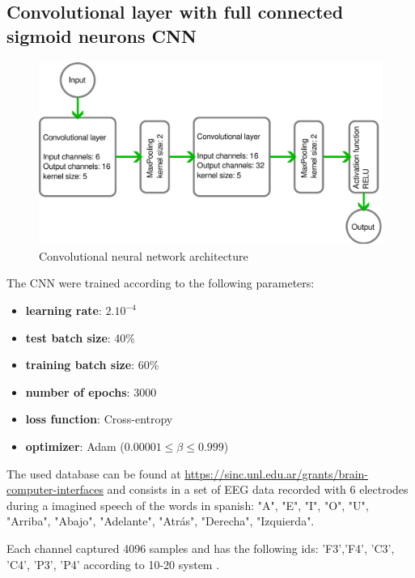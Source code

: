 	\subsection{Convolutional layer with full connected sigmoid neurons CNN}

	\begin{figure}[H]
		\centering
		\includegraphics[width=.7\linewidth]{images/architectureCNN}
		\caption{Convolutional neural network architecture}
		\label{fig:architecturecnn}
	\end{figure}

	\begin{multicols}{2}
		\par The CNN were trained according to the following parameters:
		\begin{itemize}
			\item \textbf{learning rate}: $2.10^{-4}$
			\item \textbf{test batch size}: 40\%
			\item \textbf{training batch size}: 60\%
			\item \textbf{number of epochs}: 3000
			\item \textbf{loss function}: Cross-entropy
			\item \textbf{optimizer}: Adam ($0.00001 \leq \beta \leq 0.999$)
		\end{itemize}
	\columnbreak	
		
	\end{multicols}


	\par The used  database \cite{PRG16} can be found at \href{https://sinc.unl.edu.ar/grants/brain-computer-interfaces/}{https://sinc.unl.edu.ar/grants/brain-computer-interfaces} and consists in a set of EEG data recorded with 6 electrodes during a imagined speech of the words in spanish: 
	"A", "E", "I", "O", "U", "Arriba", "Abajo", "Adelante", "Atrás", "Derecha", "Izquierda".\newline
		
	\par Each channel captured 4096 samples and has the following ids: 'F3','F4', 'C3', 'C4', 'P3', 'P4' according to 10-20 system \cite{ScienceOpenVid:5960cfa8-7fde-441c-8592-35fdb9841499}.
